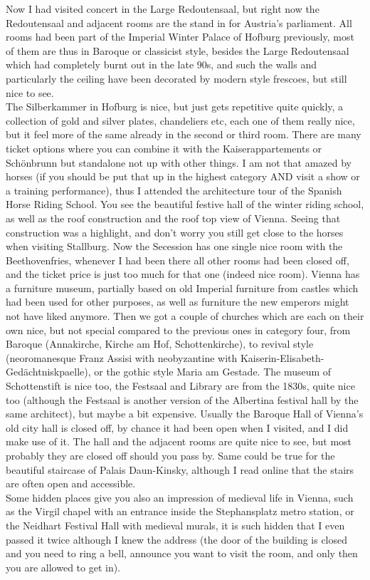 Now I had visited concert in the Large Redoutensaal, but right now the Redoutensaal and adjacent rooms are the stand in for Austria's parliament. All rooms had been part of the Imperial Winter Palace of Hofburg previously, most of them are thus in Baroque or classicist style, besides the Large Redoutensaal which had completely burnt out in the late 90s, and such the walls and particularly the ceiling have been decorated by modern style frescoes, but still nice to see.\\

The Silberkammer in Hofburg is nice, but just gets repetitive quite quickly, a collection of gold and silver plates, chandeliers etc, each one of them really nice, but it feel more of the same already in the second or third room. There are many ticket options where you can combine it with the Kaiserappartements or Sch\"onbrunn but standalone not up with other things. I am not that amazed by horses (if you should be put that up in the highest category AND visit a show or a training performance), thus I attended the architecture tour of the Spanish Horse Riding School. You see the beautiful festive hall of the winter riding school, as well as the roof construction and the roof top view of Vienna. Seeing that construction was a highlight, and don't worry you still get close to the horses when visiting Stallburg. Now the Secession has one single nice room with the Beethovenfries, whenever I had been there all other rooms had been closed off, and the ticket price is just too much for that one (indeed nice room). Vienna has a furniture museum, partially based on old Imperial furniture from castles which had been used for other purposes, as well as furniture the new emperors might not have liked anymore. Then we got a couple of churches which are each on their own nice, but not special compared to the previous ones in category four, from Baroque (Annakirche, Kirche am Hof, Schottenkirche), to revival style (neoromanesque Franz Assisi with neobyzantine with Kaiserin-Elisabeth-Ged\"achtniskpaelle), or the gothic style Maria am Gestade. The museum of Schottenstift is nice too, the Festsaal and Library are from the 1830s, quite nice too (although the Festsaal is another version of the Albertina festival hall by the same architect), but maybe a bit expensive. Usually the Baroque Hall of Vienna's old city hall is closed off, by chance it had been open when I visited, and I did make use of it. The hall and the adjacent rooms are quite nice to see, but most probably they are closed off should you pass by. Same could be true for the beautiful staircase of Palais Daun-Kinsky, although I read online that the stairs are often open and accessible.\\
Some hidden places give you also an impression of medieval life in Vienna, such as the Virgil chapel with an entrance inside the Stephansplatz metro station, or the Neidhart Festival Hall with medieval murals, it is such hidden that I even passed it twice although I knew the address (the door of the building is closed and you need to ring a bell, announce you want to visit the room, and only then you are allowed to get in).

